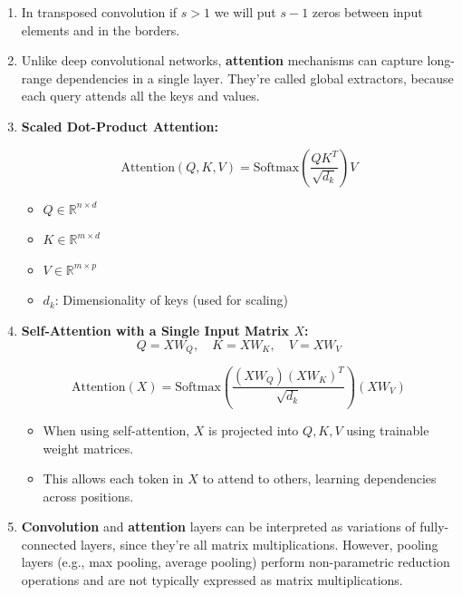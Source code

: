 \documentclass[12pt]{article}
\begin{document}
\begin{enumerate}
    \item In transposed convolution if $s > 1$ we will put $s -1$ zeros between input elements and in the borders.

    \item Unlike deep convolutional networks, \textbf{attention} mechanisms can capture long-range dependencies in a single layer. They're called global extractors, because each query attends all the keys and values.

    \item \textbf{Scaled Dot-Product Attention:}
    
    \[
    \text{Attention}(Q, K, V) = \text{Softmax}\left( \frac{QK^T}{\sqrt{d_k}} \right) V
    \]
    
    \begin{itemize}
        \item $Q \in \mathbb{R}^{n \times d}$  
        \item $K \in \mathbb{R}^{m \times d}$ 
        \item $V \in \mathbb{R}^{m \times p}$  
        \item $d_k$: Dimensionality of keys (used for scaling)
    \end{itemize}

    \item \textbf{Self-Attention with a Single Input Matrix $X$:}
    \[
    Q = X W_Q, \quad K = X W_K, \quad V = X W_V
    \]
    
    \[
    \text{Attention}(X) = \text{Softmax}\left( \frac{(X W_Q) (X W_K)^T}{\sqrt{d_k}} \right) (X W_V)
    \]
    
    \begin{itemize}
        \item When using self-attention, $X$ is projected into $Q, K, V$ using trainable weight matrices.
        \item This allows each token in $X$ to attend to others, learning dependencies across positions.
    \end{itemize}

    \item \textbf{Convolution} and \textbf{attention} layers can be interpreted as variations of fully-connected layers, since they're all matrix multiplications. However, pooling layers (e.g., max pooling, average pooling) perform non-parametric reduction operations and are not typically expressed as matrix multiplications.
    \end{enumerate}
    
\end{document}
